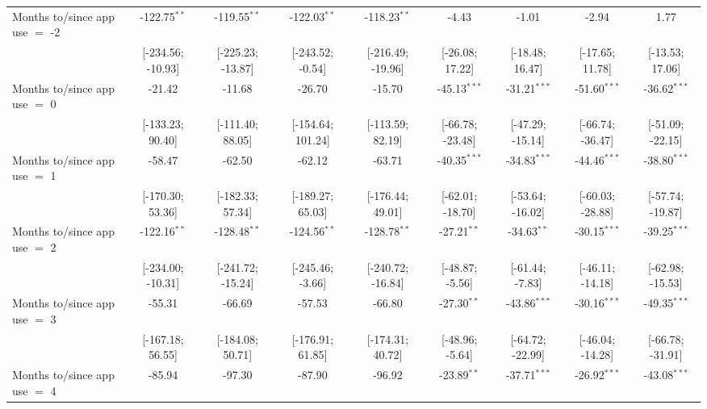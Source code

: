 \begin{table}[htbp]
\begin{threeparttable}[b]
\begin{tabular}{lcccccccc}
         Months to/since app use $=$ -2  & -122.75$^{**}$    & -119.55$^{**}$    & -122.03$^{**}$    & -118.23$^{**}$    & -4.43              & -1.01            & -2.94              & 1.77\\   
                                         & [-234.56; -10.93] & [-225.23; -13.87] & [-243.52; -0.54]  & [-216.49; -19.96] & [-26.08; 17.22]    & [-18.48; 16.47]  & [-17.65; 11.78]    & [-13.53; 17.06]\\   
         Months to/since app use $=$ 0   & -21.42            & -11.68            & -26.70            & -15.70            & -45.13$^{***}$     & -31.21$^{***}$   & -51.60$^{***}$     & -36.62$^{***}$\\   
                                         & [-133.23; 90.40]  & [-111.40; 88.05]  & [-154.64; 101.24] & [-113.59; 82.19]  & [-66.78; -23.48]   & [-47.29; -15.14] & [-66.74; -36.47]   & [-51.09; -22.15]\\   
         Months to/since app use $=$ 1   & -58.47            & -62.50            & -62.12            & -63.71            & -40.35$^{***}$     & -34.83$^{***}$   & -44.46$^{***}$     & -38.80$^{***}$\\   
                                         & [-170.30; 53.36]  & [-182.33; 57.34]  & [-189.27; 65.03]  & [-176.44; 49.01]  & [-62.01; -18.70]   & [-53.64; -16.02] & [-60.03; -28.88]   & [-57.74; -19.87]\\   
         Months to/since app use $=$ 2   & -122.16$^{**}$    & -128.48$^{**}$    & -124.56$^{**}$    & -128.78$^{**}$    & -27.21$^{**}$      & -34.63$^{**}$    & -30.15$^{***}$     & -39.25$^{***}$\\   
                                         & [-234.00; -10.31] & [-241.72; -15.24] & [-245.46; -3.66]  & [-240.72; -16.84] & [-48.87; -5.56]    & [-61.44; -7.83]  & [-46.11; -14.18]   & [-62.98; -15.53]\\   
         Months to/since app use $=$ 3   & -55.31            & -66.69            & -57.53            & -66.80            & -27.30$^{**}$      & -43.86$^{***}$   & -30.16$^{***}$     & -49.35$^{***}$\\   
                                         & [-167.18; 56.55]  & [-184.08; 50.71]  & [-176.91; 61.85]  & [-174.31; 40.72]  & [-48.96; -5.64]    & [-64.72; -22.99] & [-46.04; -14.28]   & [-66.78; -31.91]\\   
         Months to/since app use $=$ 4   & -85.94            & -97.30            & -87.90            & -96.92            & -23.89$^{**}$      & -37.71$^{***}$   & -26.92$^{***}$     & -43.08$^{***}$\\   

\end{tabular}
\end{threeparttable}
\end{table}
